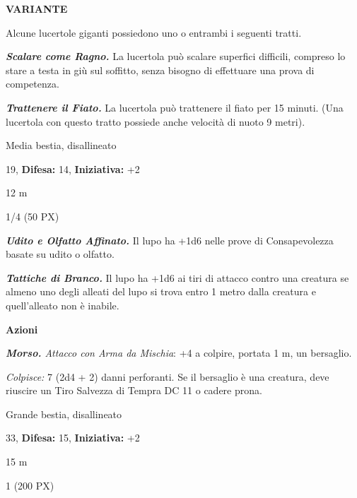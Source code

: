 \begin{multicols}{2}
{\textbf{VARIANTE}

Alcune lucertole giganti possiedono uno o entrambi i seguenti tratti.

\emph{\textbf{Scalare come Ragno.}} La lucertola può scalare superfici difficili, compreso lo stare a testa in giù sul soffitto, senza bisogno di effettuare una prova di competenza.

\emph{\textbf{Trattenere il Fiato.}} La lucertola può trattenere il fiato per 15 minuti. (Una lucertola con questo tratto possiede anche velocità di nuoto 9 metri).

\begin{description}[noitemsep, topsep=0pt, parsep=0pt, partopsep=0pt, leftmargin=0cm, labelwidth=2.2cm]
    \item[\textbf{Taglia/Tipo:}] Media bestia, disallineato
    \item[\textbf{Caratt.:}] 
    \item[\textbf{Punti Ferita:}] 19,  \textbf{Difesa:} 14,  \textbf{Iniziativa:} +2
    \item[\textbf{Tiri Salvez.:}] 
    \item[\textbf{Movimento:}] 12 m
    \item[\textbf{Sfida:}] 1/4 (50 PX)\smallskip
\end{description}

\emph{\textbf{Udito e Olfatto Affinato.}} Il lupo ha +1d6 nelle prove di Consapevolezza basate su udito o olfatto.

\emph{\textbf{Tattiche di Branco.}} Il lupo ha +1d6 ai tiri di attacco contro una creatura se almeno uno degli alleati del lupo si trova entro 1 metro dalla creatura e quell'alleato non è inabile.

\textbf{Azioni}

\emph{\textbf{Morso.} Attacco con Arma da Mischia}: +4 a colpire, portata 1 m, un bersaglio.

\emph{Colpisce:} 7 (2d4 + 2) danni perforanti. Se il bersaglio è una creatura, deve riuscire un Tiro Salvezza di Tempra DC 11 o cadere prona.

\begin{description}[noitemsep, topsep=0pt, parsep=0pt, partopsep=0pt, leftmargin=0cm, labelwidth=2.2cm]
    \item[\textbf{Taglia/Tipo:}] Grande bestia, disallineato
    \item[\textbf{Caratt.:}] 
    \item[\textbf{Punti Ferita:}] 33,  \textbf{Difesa:} 15,  \textbf{Iniziativa:} +2
    \item[\textbf{Tiri Salvez.:}] 
    \item[\textbf{Movimento:}] 15 m
    \item[\textbf{Sfida:}] 1 (200 PX)\smallskip
\end{description}

}
\end{multicols}
